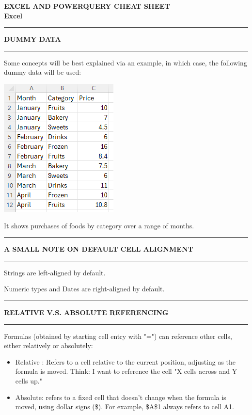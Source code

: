 \documentclass[8pt]{extarticle}
\newcommand{\heading}[1]{%
    \noindent
    \rule{\linewidth}{0.4pt}
    \begin{center}
        \vspace{-1ex}
        \textbf{#1}        
        \vspace{-2.5ex}
    \end{center}
    \rule{\linewidth}{0.4pt}
}
\begin{document}
\thispagestyle{empty} 

\begin{center}   
{\huge\textbf{EXCEL AND POWERQUERY CHEAT SHEET}}\\
\vspace*{0.5cm}
{\huge\textbf{Excel}}
\vspace*{0.75cm}
\end{center}

\begin{multicols}{3}
\setlength{\columnseprule}{1pt} %


\heading{DUMMY DATA}

Some concepts will be best explained via an example, in which case, the following dummy data will be used:

\begin{center}
    \includegraphics[width = 0.55\columnwidth]{images/dummy_data.png}
\end{center}

It shows purchases of foods by category over a range of months.

\heading{A SMALL NOTE ON DEFAULT CELL ALIGNMENT}

Strings are left-aligned by default. 

Numeric types and Dates are right-aligned by default.

\heading{RELATIVE V.S. ABSOLUTE REFERENCING}

Formulas (obtained by starting cell entry with "=") can reference other cells, either relatively or absolutely:
\begin{itemize}
\item Relative : Refers to a cell relative to the current position, adjusting as the formula is moved. Think: I want to reference the cell "X cells across and Y cells up."
\item Absolute: refers to a fixed cell that doesn’t change when the formula is moved, using dollar signs (\$). For example, \$A\$1 always refers to cell A1.
\end{itemize}


\end{multicols}
\end{document}
